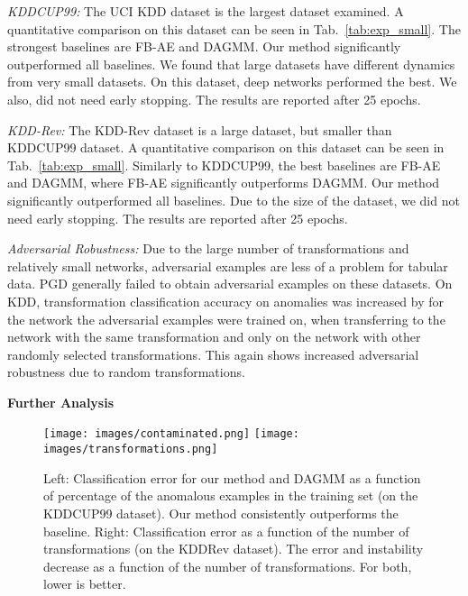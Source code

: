\documentclass{article} \usepackage{iclr2020_conference,times}
\begin{document}
\textit{KDDCUP99:} The UCI KDD  dataset is the largest dataset examined. A quantitative comparison on this dataset can be seen in Tab.~\ref{tab:exp_small}. The strongest baselines are FB-AE and DAGMM. Our method significantly outperformed all baselines. We found that large datasets have different dynamics from very small datasets. On this dataset, deep networks performed the best. We also, did not need early stopping. The results are reported after 25 epochs.

\textit{KDD-Rev:} The KDD-Rev dataset is a large dataset, but smaller than KDDCUP99 dataset. A quantitative comparison on this dataset can be seen in Tab.~\ref{tab:exp_small}. Similarly to KDDCUP99, the best baselines are FB-AE and DAGMM, where FB-AE significantly outperforms DAGMM. Our method significantly outperformed all baselines. Due to the size of the dataset, we did not need early stopping. The results are reported after 25 epochs.

\textit{Adversarial Robustness:} Due to the large number of transformations and relatively small networks, adversarial examples are less of a problem for tabular data. PGD generally failed to obtain adversarial examples on these datasets. On KDD, transformation classification accuracy on anomalies was increased by  for the network the adversarial examples were trained on,  when transferring to the network with the same transformation and only  on the network with other randomly selected transformations. This again shows increased adversarial robustness due to random transformations. 

\textbf{Further Analysis}

\begin{figure}[tb]
\begin{center}
\texttt{[image: images/contaminated.png]}
\texttt{[image: images/transformations.png]}
\end{center}
\caption{Left: Classification error for our method and DAGMM as a function of percentage of the anomalous examples in the training set (on the KDDCUP99 dataset). Our method consistently outperforms the baseline. Right: Classification error as a function of the number of transformations (on the KDDRev dataset). The error and instability decrease as a function of the number of transformations. For both, lower is better.}
\label{fig:contaminated_trans}
\vspace{-1em}
\end{figure}
\end{document}
